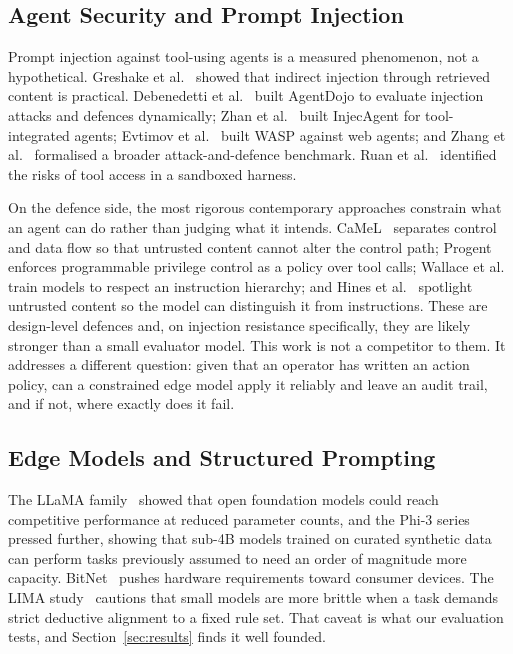 \documentclass[conference]{IEEEtran}
\begin{document}
\subsection{Agent Security and Prompt Injection}
Prompt injection against tool-using agents is a measured phenomenon, not a hypothetical. Greshake et al.~\cite{greshake2023} showed that indirect injection through retrieved content is practical. Debenedetti et al.~\cite{debenedetti2024} built AgentDojo to evaluate injection attacks and defences dynamically; Zhan et al.~\cite{zhan2024} built InjecAgent for tool-integrated agents; Evtimov et al.~\cite{evtimov2025} built WASP against web agents; and Zhang et al.~\cite{zhang2025asb} formalised a broader attack-and-defence benchmark. Ruan et al.~\cite{ruan2023} identified the risks of tool access in a sandboxed harness.

On the defence side, the most rigorous contemporary approaches constrain what an agent can do rather than judging what it intends. CaMeL~\cite{debenedetti2025} separates control and data flow so that untrusted content cannot alter the control path; Progent~\cite{shi2025} enforces programmable privilege control as a policy over tool calls; Wallace et al.~\cite{wallace2024} train models to respect an instruction hierarchy; and Hines et al.~\cite{hines2024} spotlight untrusted content so the model can distinguish it from instructions. These are design-level defences and, on injection resistance specifically, they are likely stronger than a small evaluator model. This work is not a competitor to them. It addresses a different question: given that an operator has written an action policy, can a constrained edge model apply it reliably and leave an audit trail, and if not, where exactly does it fail.

\subsection{Edge Models and Structured Prompting}
The LLaMA family~\cite{touvron2023} showed that open foundation models could reach competitive performance at reduced parameter counts, and the Phi-3 series~\cite{abdin2024} pressed further, showing that sub-4B models trained on curated synthetic data can perform tasks previously assumed to need an order of magnitude more capacity. BitNet~\cite{ma2024} pushes hardware requirements toward consumer devices. The LIMA study~\cite{zhou2023} cautions that small models are more brittle when a task demands strict deductive alignment to a fixed rule set. That caveat is what our evaluation tests, and Section~\ref{sec:results} finds it well founded.
\end{document}
